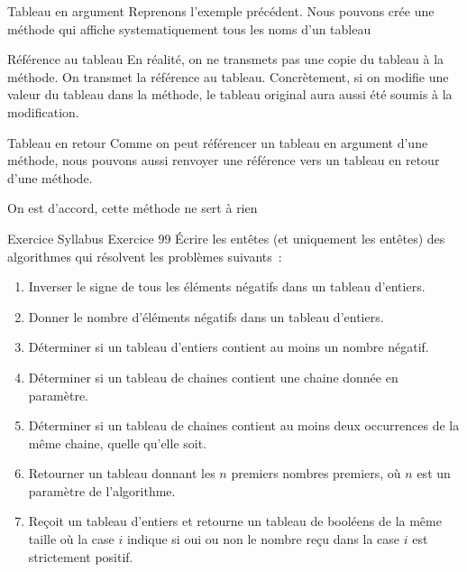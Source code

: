 \begin{frame}{Tableau en argument}
    Reprenons l'exemple précédent. Nous pouvons crée une méthode qui affiche systematiquement tous les noms d'un tableau
    

    \begin{alertblock}{Référence au tableau}
        En réalité, on ne transmets pas une copie du tableau à la méthode. On transmet la référence au tableau.
        Concrètement, si on modifie une valeur du tableau dans la méthode,
        le tableau original aura aussi été soumis à la modification.
    \end{alertblock}
\end{frame}

\begin{frame}{Tableau en retour}
    Comme on peut référencer un tableau en argument d'une méthode,
    nous pouvons aussi renvoyer une référence vers un tableau en retour d'une méthode.
    

    \center\tiny On est d'accord, cette méthode ne sert à rien
\end{frame}

\begin{frame}[shrink]{Exercice \theexercice}{Syllabus Exercice 99}
    Écrire les entêtes (et uniquement les entêtes)
    des algorithmes qui résolvent les problèmes suivants~:
    \begin{enumerate}
        \item
        Inverser le signe de tous les éléments négatifs dans un tableau d’entiers.
        \item
        Donner le nombre d’éléments négatifs dans un tableau d’entiers.
        \item
        Déterminer si un tableau d’entiers contient au moins un nombre négatif.
        \item
        Déterminer si un tableau de chaines contient
        une chaine donnée en paramètre.
        \item
        Déterminer si un tableau de chaines contient
        au moins deux occurrences de la même chaine,
        quelle qu’elle soit.
        \item
        Retourner un tableau donnant les $n$ premiers nombres premiers,
        où $n$ est un paramètre de l’algorithme.
        \item
        Reçoit un tableau d’entiers
        et retourne un tableau de booléens de la même taille
        où la case $i$ indique si oui ou non
        le nombre reçu dans la case $i$ est strictement positif.
    \end{enumerate}
\end{frame}

